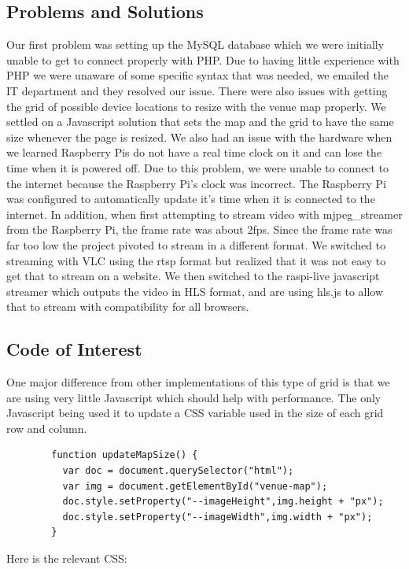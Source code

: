 \documentclass[onecolumn, draftclsnofoot,10pt, compsoc]{IEEEtran}
\begin{document}
    \subsection{Problems and Solutions}
        Our first problem was setting up the MySQL database which we were initially unable to get to connect properly with PHP. 
        Due to having little experience with PHP we were unaware of some specific syntax that was needed, we emailed the IT department and they resolved our issue. 
        There were also issues with getting the grid of possible device locations to resize with the venue map properly. 
        We settled on a Javascript solution that sets the map and the grid to have the same size whenever the page is resized.
        We also had an issue with the hardware when we learned Raspberry Pis do not have a real time clock on it and can lose the time when it is powered off. 
        Due to this problem, we were unable to connect to the internet because the Raspberry Pi's clock was incorrect. 
        The Raspberry Pi was configured to automatically update it's time when it is connected to the internet. 
        In addition, when first attempting to stream video with mjpeg\_streamer from the Raspberry Pi, the frame rate was about 2fps. 
        Since the frame rate was far too low the project pivoted to stream in a different format. 
        We switched to streaming with VLC using the rtsp format but realized that it was not easy to get that to stream on a website.
        We then switched to the raspi-live javascript streamer which outputs the video in HLS format, and are using hls.js to allow that to stream with compatibility for all browsers.
    
    \subsection{Code of Interest}
        One major difference from other implementations of this type of grid is that we are using very little Javascript which should help with performance.
        The only Javascript being used it to update a CSS variable used in the size of each grid row and column.
        \begin{lstlisting}
        function updateMapSize() {
          var doc = document.querySelector("html");
          var img = document.getElementById("venue-map");
          doc.style.setProperty("--imageHeight",img.height + "px");
          doc.style.setProperty("--imageWidth",img.width + "px");
        }
        \end{lstlisting}
        Here is the relevant CSS:
        
\end{document}
